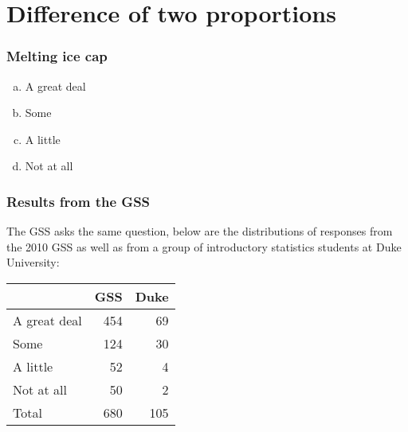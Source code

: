
\section{Difference of two proportions}


\begin{frame}
\frametitle{Melting ice cap}


\begin{enumerate}[(a)]
\item A great deal
\item Some
\item A little
\item Not at all
\end{enumerate}

\end{frame}


\begin{frame}
\frametitle{Results from the GSS}

The GSS asks the same question, below are the distributions of responses from the 2010 GSS as well as from a group of introductory statistics students at Duke University: \\

\begin{center}
\begin{tabular}{l r r}
\hline
				& GSS	& Duke \\
\hline
A great deal		& 454	& 69 \\
Some			& 124 	& 30\\
A little			& 52 		& 4\\
Not at all			& 50 		& 2 \\
\hline
Total				& 680 	& 105\\
\hline
\end{tabular}
\end{center}

\end{frame}


